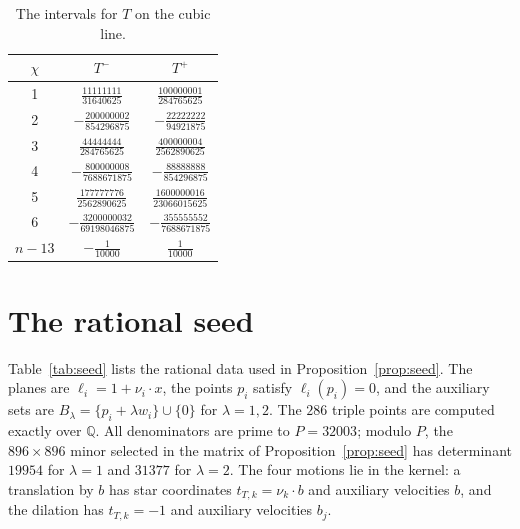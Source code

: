 \documentclass{amsart}
\theoremstyle{definition}
\theoremstyle{remark}
\numberwithin{equation}{section}
\newcommand{\QQ}{\mathbb{Q}}
\begin{document}
\begin{table}[H]\small\renewcommand{\arraystretch}{1.6}
\caption{The intervals for $T$ on the cubic line.}\label{tab:cubicint}
\begin{tabular}{ccc}\toprule $\chi$&$T^-$&$T^+$\\\midrule
1&$\frac{11111111}{31640625}$&$\frac{100000001}{284765625}$\\
2&$-\frac{200000002}{854296875}$&$-\frac{22222222}{94921875}$\\
3&$\frac{44444444}{284765625}$&$\frac{400000004}{2562890625}$\\
4&$-\frac{800000008}{7688671875}$&$-\frac{88888888}{854296875}$\\
5&$\frac{177777776}{2562890625}$&$\frac{1600000016}{23066015625}$\\
6&$-\frac{3200000032}{69198046875}$&$-\frac{355555552}{7688671875}$\\
$n-13$&$-\frac{1}{10000}$&$\frac{1}{10000}$\\
\bottomrule\end{tabular}\end{table}

\section{The rational seed}\label{app:seed}

Table~\ref{tab:seed} lists the rational data used in Proposition~\ref{prop:seed}. The planes
are $\ell_i=1+\nu_i\cdot x$, the points $p_i$ satisfy $\ell_i(p_i)=0$, and the auxiliary sets
are $B_\lambda=\{p_i+\lambda w_i\}\cup\{0\}$ for $\lambda=1,2$. The $286$ triple points are
computed exactly over $\QQ$. All denominators are prime to $P=32003$; modulo $P$, the
$896\times896$ minor selected in the matrix of Proposition~\ref{prop:seed} has determinant
$19954$ for $\lambda=1$ and $31377$ for $\lambda=2$. The four motions lie in the kernel:
a translation by $b$ has star coordinates $t_{T,k}=\nu_k\cdot b$ and auxiliary velocities $b$,
and the dilation has $t_{T,k}=-1$ and auxiliary velocities $b_j$.
\end{document}
